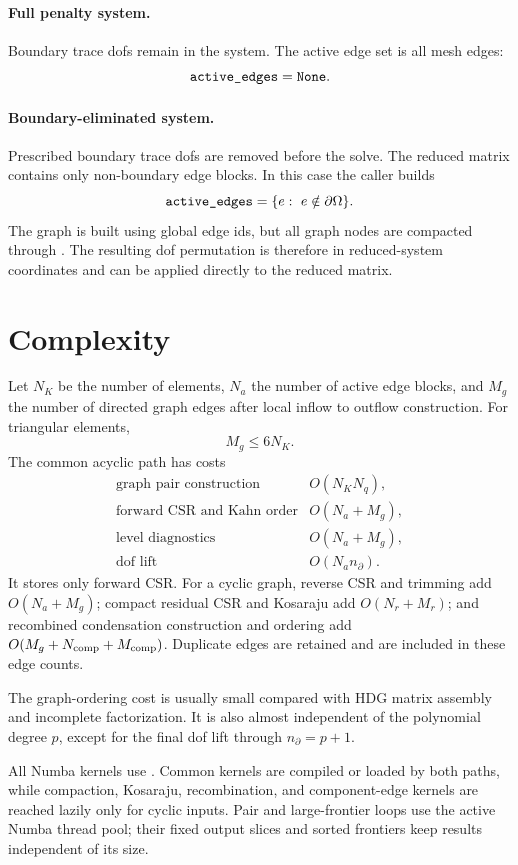 \documentclass[11pt]{article}
\newcommand{\code}[1]{\texttt{\detokenize{#1}}}
\begin{document}
\paragraph{Full penalty system.}
Boundary trace dofs remain in the system.  The active edge set is all mesh
edges:
\[
  \code{active_edges} = \code{None}.
\]

\paragraph{Boundary-eliminated system.}
Prescribed boundary trace dofs are removed before the solve.  The reduced
matrix contains only non-boundary edge blocks.  In this case the caller builds
\[
  \code{active_edges} = \{e:\ e \notin \partial\Omega\}.
\]
The graph is built using global edge ids, but all graph nodes are compacted
through \code{old_to_active}.  The resulting dof permutation is therefore in
reduced-system coordinates and can be applied directly to the reduced matrix.

\section{Complexity}

Let \(N_K\) be the number of elements, \(N_a\) the number of active edge
blocks, and \(M_g\) the number of directed graph edges after local inflow to
outflow construction.  For triangular elements,
\[
  M_g \le 6N_K.
\]
The common acyclic path has costs
\[
\begin{array}{ll}
\text{graph pair construction} & O(N_K N_q),\\
\text{forward CSR and Kahn order} & O(N_a + M_g),\\
\text{level diagnostics} & O(N_a + M_g),\\
\text{dof lift} & O(N_a n_{\partial}).
\end{array}
\]
It stores only forward CSR.  For a cyclic graph, reverse CSR and trimming add
\(O(N_a+M_g)\); compact residual CSR and Kosaraju add \(O(N_r+M_r)\); and
recombined condensation construction and ordering add
\(O(M_g+N_{\rm comp}+M_{\rm comp})\).  Duplicate edges are retained and are
included in these edge counts.

The graph-ordering cost is usually small compared with HDG matrix assembly and
incomplete factorization.  It is also almost independent of the polynomial
degree \(p\), except for the final dof lift through \(n_{\partial}=p+1\).

All Numba kernels use \code{cache=True}.  Common kernels are compiled or loaded
by both paths, while compaction, Kosaraju, recombination, and component-edge
kernels are reached lazily only for cyclic inputs.  Pair and large-frontier
loops use the active Numba thread pool; their fixed output slices and sorted
frontiers keep results independent of its size.
\end{document}
